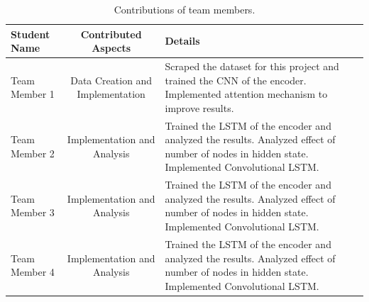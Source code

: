 \documentclass[10pt,twocolumn,letterpaper]{article}
\begin{document}
\begin{table}
\begin{center}
\begin{tabular}{|l|c|p{8cm}|}
\hline
Student Name & Contributed Aspects & Details \\
\hline\hline
Team Member 1 & Data Creation and Implementation & Scraped the dataset for this project and trained the CNN of the encoder. Implemented attention mechanism to improve results. \\
Team Member 2 & Implementation and Analysis & Trained the LSTM of the encoder and analyzed the results. Analyzed effect of number of nodes in hidden state.  Implemented Convolutional LSTM. \\
Team Member 3 & Implementation and Analysis & Trained the LSTM of the encoder and analyzed the results. Analyzed effect of number of nodes in hidden state.  Implemented Convolutional LSTM. \\
Team Member 4 & Implementation and Analysis & Trained the LSTM of the encoder and analyzed the results. Analyzed effect of number of nodes in hidden state.  Implemented Convolutional LSTM. \\
\hline
\end{tabular}
\end{center}
\caption{Contributions of team members.}
\label{tab:contributions}
\end{table}
\end{document}
